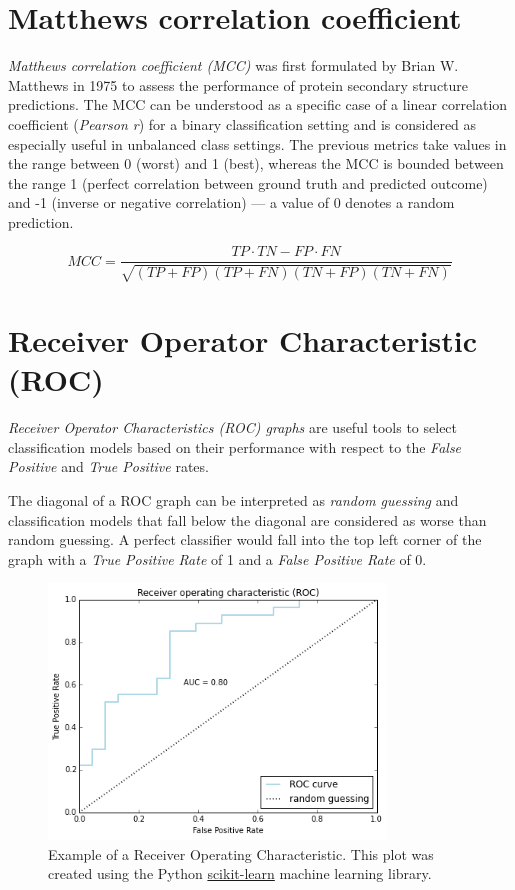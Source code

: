 \documentclass{article}
\begin{document}
\section{Matthews correlation coefficient}

\emph{Matthews correlation coefficient (MCC)} was first formulated by Brian W. Matthews \cite{matthews1975comparison} in 1975 to assess the performance of protein secondary structure predictions. The MCC can be understood as a specific case of a linear correlation coefficient (\emph{Pearson r}) for a binary classification setting and is considered as especially useful in unbalanced class settings.
The previous metrics take values in the range between 0 (worst) and 1 (best), whereas the MCC is bounded between the range 1 (perfect correlation between ground truth and predicted outcome) and -1 (inverse or negative correlation) --- a value of 0 denotes a random prediction. 

\begin{equation} MCC = \frac{ TP \cdot TN - FP \cdot FN } {\sqrt{ (TP + FP) ( TP + FN ) ( TN + FP ) ( TN + FN ) } } \end{equation}



\section{Receiver Operator Characteristic (ROC)}

\emph{Receiver Operator Characteristics (ROC) graphs} are useful tools to select classification models based on their performance with respect to the \emph{False Positive} and \emph{True Positive} rates. 


The diagonal of a ROC graph can be interpreted as \emph{random guessing} and classification models that fall below the diagonal are considered as worse than random guessing. A perfect classifier would fall into the top left corner of the graph with a \emph{True Positive Rate} of 1 and a  \emph{False Positive Rate} of 0.

\begin{figure}[h!]
    \centering
    \includegraphics[width=0.8\textwidth]{./plot/roc.png}
    \caption{Example of a Receiver Operating Characteristic. This plot was created using the Python \href{http://scikit-learn.org/stable/auto_examples/plot_roc.html}{scikit-learn} machine learning library.}

\end{figure}
\end{document}
